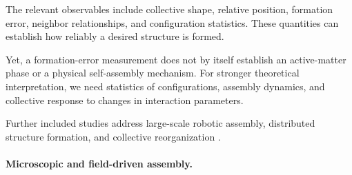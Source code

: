 The relevant observables
include collective shape,
relative position,
formation error,
neighbor relationships,
and configuration
statistics. These
quantities can establish
how reliably a desired
structure is formed.

Yet, a formation-error
measurement does not
by itself establish
an active-matter
phase or a physical
self-assembly mechanism.
For stronger theoretical
interpretation, we need
statistics of configurations,
assembly dynamics,
and collective response
to changes in
interaction parameters.

Further included studies
address large-scale
robotic assembly,
distributed structure
formation, and
collective reorganization
\cite{Christensen2007morphologycontroli,ICHIKAWA2004smallintelligentro,Garnier2005collectivedecision,Saladdino2026distributedcontrol,RekabiBana2025lyapunovstabilityd,Khaledyan2019flockingandtarget,Maffettone2024mixedrealityenviro,Nouyan2009teamworkinselforg,Hart2022unifyingcontrolarc,Marina2015controllingrigidfo,Hu2021groupcoordinatedco,Rubenstein2014programmableselfas,Kernbach2013adaptivecollective,Na2020bioinspiredartific,ABO20152a1k08effectsofi,Ito2011keepingofflockbeh,Khaledyan2018formationcontrolof,Chamanbaz2017swarmenablingtechn,Giusti2023distributedcontrol,Luan2023selforganizedaggre,Fu2023entropybyneighbor,Fats2012arobustschemefor,Doimo2025sonoroaswarmrobo,Ensenada2025flockingcontrolfor,Makino2004collectivebehavior,Prasath2022dynamicsofcooperat,Tuci2008selfassemblyinphy,Punpaisarn2008sutcargcarlikero,Tran2021robustmultirobotc,WAKATSUKI2018untitled}.



\paragraph*{Microscopic and field-driven assembly.}

